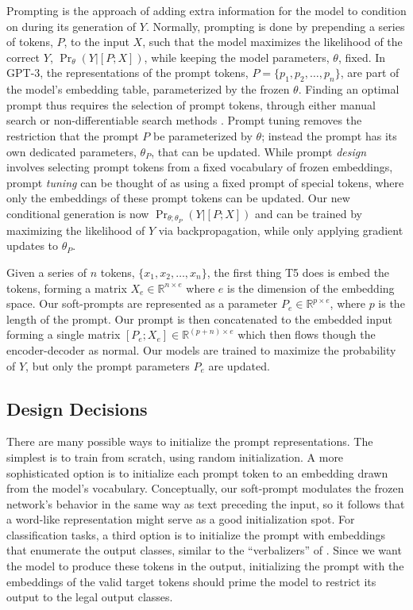 Prompting is the approach of adding extra information for the model to condition on during its generation of $Y$. Normally, prompting is done by prepending a series of tokens, $P$, to the input $X$, such that the model maximizes the likelihood of the correct $Y$, $\Pr_{\theta}(Y|[P;X])$, while keeping the model parameters, $\theta$, fixed. In \mbox{GPT-3}, the representations of the prompt tokens, $P = \{p_1, p_2, \dots, p_n\}$, are part of the model's embedding table, parameterized by the frozen $\theta$. Finding an optimal prompt thus requires the selection of prompt tokens, through either manual search or non-differentiable search methods \cite{jiang-etal-2020-know,shin-etal-2020-autoprompt}. Prompt tuning removes the restriction that the prompt $P$ be parameterized by $\theta$; instead the prompt has its own dedicated parameters, $\theta_P$, that can be updated. While prompt \emph{design} involves selecting prompt tokens from a fixed vocabulary of frozen embeddings, prompt \emph{tuning} can be thought of as using a fixed prompt of special tokens, where only the embeddings of these prompt tokens can be updated. Our new conditional generation is now $\Pr_{\theta;\theta_P}(Y | [P;X])$ and can be trained by maximizing the likelihood of $Y$ via backpropagation, while only applying gradient updates to $\theta_P$.

Given a series of $n$ tokens, $\{x_1, x_2, \dots, x_n\}$, the first thing T5 does is embed the tokens, forming a matrix $X_e \in \mathbb{R}^{n \times e}$ where $e$ is the dimension of the embedding space. Our soft-prompts are represented as a parameter $P_e \in \mathbb{R}^{p \times e}$, where $p$ is the length of the prompt. Our prompt is then concatenated to the embedded input forming a single matrix $[P_e;X_e] \in \mathbb{R}^{(p+n)\times e}$ which then flows though the encoder-decoder as normal. Our models are trained to maximize the probability of $Y$, but only the prompt parameters $P_e$ are updated.

\subsection{Design Decisions}

There are many possible ways to initialize the prompt representations. The simplest is to train from scratch, using random initialization. A more sophisticated option is to initialize each prompt token to an embedding drawn from the model's vocabulary. Conceptually, our soft-prompt modulates the frozen network's behavior in the same way as text preceding the input, so it follows that a word-like representation might serve as a good initialization spot. For classification tasks, a third option is to initialize the prompt with embeddings that enumerate the output classes, similar to the ``verbalizers'' of \citet{schick-schutze-2021-exploiting}. Since we want the model to produce these tokens in the output, initializing the prompt with the embeddings of the valid target tokens should prime the model to restrict its output to the legal output classes. 

